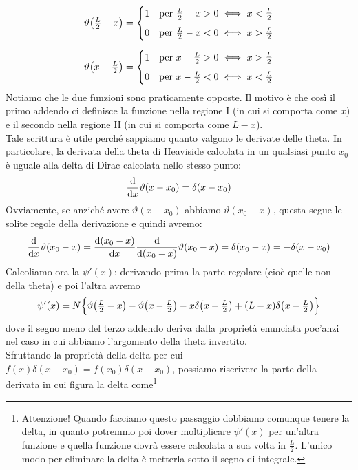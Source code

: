 \begin{soluzione}
\begin{gather*}
      \vartheta\qty( \textstyle \frac{L}{2} \displaystyle - x )=
      \begin{cases}
         1 & \text{per } \frac{L}{2} - x > 0 \iff x < \frac{L}{2}\\[0.2cm]
         0 & \text{per } \frac{L}{2} - x < 0 \iff x > \frac{L}{2}
      \end{cases}
      \\[0.2cm]
      \vartheta\qty( x - \textstyle \frac{L}{2} \displaystyle)=
      \begin{cases}
         1 & \text{per } x - \frac{L}{2} > 0 \iff x > \frac{L}{2}\\[0.2cm]
         0 & \text{per } x - \frac{L}{2} < 0 \iff x < \frac{L}{2}
      \end{cases}
   \end{gather*}
   Notiamo che le due funzioni sono praticamente opposte. Il motivo è che così il primo addendo ci definisce la funzione nella regione I (in cui si comporta come $x$) e il secondo nella regione II (in cui si comporta come $L-x$).\\
   Tale scrittura è utile perché sappiamo quanto valgono le derivate delle theta. In particolare, la derivata della theta di Heaviside calcolata in un qualsiasi punto $x_0$ è uguale alla delta di Dirac calcolata nello stesso punto:
   \begin{equation*}
      \dv{x}\vartheta(x-x_0)
      =\delta(x-x_0)
   \end{equation*}
   Ovviamente, se anziché avere $\vartheta(x-x_0)$ abbiamo $\vartheta(x_0-x)$, questa segue le solite regole della derivazione e quindi avremo:
   \begin{equation*}
      \dv{x}\vartheta(x_0-x)
      =\dv{(x_0-x)}{x}\dv{(x_0-x)}\vartheta(x_0-x)
      =\delta(x_0-x)
      =-\delta(x-x_0)
   \end{equation*}
   Calcoliamo ora la $\psi'(x)$: derivando prima la parte regolare (cioè quelle non della theta) e poi l'altra avremo
   \begin{equation*}
      \psi'(x)=N\Big\{ \vartheta\qty( \textstyle \frac{L}{2} \displaystyle - x ) - \vartheta\qty( x - \textstyle \frac{L}{2} \displaystyle) - x\delta\qty( x - \textstyle \frac{L}{2} \displaystyle ) + (L - x)\delta\qty( x - \textstyle \frac{L}{2} \displaystyle ) \Big\}
   \end{equation*}
   dove il segno meno del terzo addendo deriva dalla proprietà enunciata poc'anzi nel caso in cui abbiamo l'argomento della theta invertito.\\
   Sfruttando la proprietà della delta per cui $f(x)\delta(x - x_0)=f(x_0)\delta(x - x_0)$, possiamo riscrivere la parte della derivata in cui figura la delta come\footnote{Attenzione! Quando facciamo questo passaggio dobbiamo comunque tenere la delta, in quanto potremmo poi dover moltiplicare $\psi'(x)$ per un'altra funzione e quella funzione dovrà essere calcolata a sua volta in $\frac{L}{2}$. L'unico modo per eliminare la delta è metterla sotto il segno di integrale.}

\end{soluzione}
